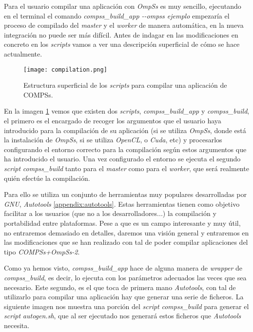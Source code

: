Para el usuario compilar una aplicación con \textit{OmpSs} es muy sencillo, ejecutando en el terminal el comando \textit{compss\_build\_app -{}-ompss ejemplo} empezaría el proceso de compilado del \textit{master} y el \textit{worker} de manera automática, en la nueva integración no puede ser más difícil. Antes de indagar en las modificaciones en concreto en los \textit{scripts} vamos a ver una descripción superficial de cómo se hace actualmente.

\bigskip
\begin{figure}[H]
	\centering 
	\caption{Estructura superficial de los \textit{scripts} para compilar una aplicación de COMPSs.}
	\texttt{[image: compilation.png]}
	\label{fig:compilado}
\end{figure}
\par\bigskip

En la imagen \ref{fig:compilado} vemos que existen dos \textit{scripts}, \textit{compss\_build\_app} y \textit{compss\_build}, el primero es el encargado de recoger los argumentos que el usuario haya introducido para la compilación de su aplicación (si se utiliza \textit{OmpSs}, donde está la instalación de \textit{OmpSs}, si se utiliza \textit{OpenCL}, o \textit{Cuda}, etc) y procesarlos configurando el entorno correcto para la compilación según estos argumentos que ha introducido el usuario. Una vez configurado el entorno se ejecuta el segundo \textit{script} \textit{compss\_build} tanto para el \textit{master} como para el \textit{worker}, que será realmente quién efectúe la compilación. 
\par\bigskip
Para ello se utiliza un conjunto de herramientas muy populares desarrolladas por \textit{GNU},  \textit{Autotools} \ref{appendix:autotools}. Estas herramientas tienen como objetivo facilitar a los usuarios (que no a los desarrolladores...) la compilación y portabilidad entre plataformas. Pese a que es un campo interesante y muy útil, no entraremos demasiado en detalles, daremos una visión general y entraremos en las modificaciones que se han realizado con tal de poder compilar aplicaciones del tipo \textit{COMPSs+OmpSs-2}. 
\par\bigskip
Como ya hemos visto, \textit{compss\_build\_app} hace de alguna manera de \textit{wrapper} de \textit{compss\_build}, es decir, lo ejecuta con los parámetros adecuados las veces que sea necesario. Este segundo, es el que toca de primera mano \textit{Autotools}, con tal de utilizarlo para compilar una aplicación hay que generar una serie de ficheros. La siguiente imagen nos muestra una porción del \textit{script}  \textit{compss\_build} para generar el \textit{script} \textit{autogen.sh}, que al ser ejecutado nos generará estos ficheros que \textit{Autotools} necesita.
\bigskip

